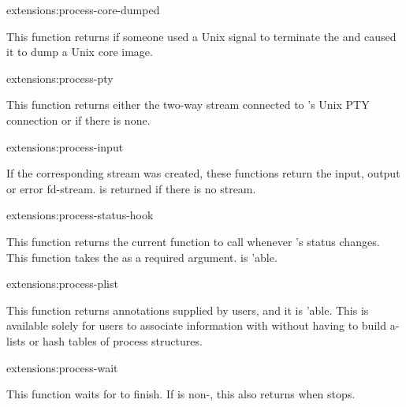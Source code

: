 \begin{defun}{extensions:}{process-core-dumped}{}
  
  This function returns \true{} if someone used a Unix signal to
  terminate the  and caused it to dump a Unix core image.
\end{defun}

\begin{defun}{extensions:}{process-pty}{}
  
  This function returns either the two-way stream connected to
  's Unix PTY connection or \nil{} if there is none.
\end{defun}

\begin{defun}{extensions:}{process-input}{}
  
  If the corresponding stream was created, these functions return the
  input, output or error fd-stream.  \nil{} is returned if there
  is no stream.
\end{defun}

\begin{defun}{extensions:}{process-status-hook}{}
  
  This function returns the current function to call whenever
  's status changes.  This function takes the
   as a required argument.   is
  'able.
\end{defun}

\begin{defun}{extensions:}{process-plist}{}
  
  This function returns annotations supplied by users, and it is
  'able.  This is available solely for users to associate
  information with  without having to build a-lists or
  hash tables of process structures.
\end{defun}

\begin{defun}{extensions:}{process-wait}{
    }
  
  This function waits for  to finish.  If
   is non-\nil, this also returns when
   stops.
\end{defun}

